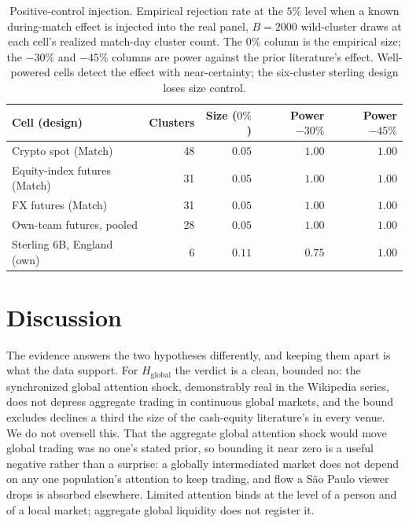 \documentclass[12pt]{article}
\begin{document}
\begin{table}[h]\centering\small\setlength{\tabcolsep}{7pt}
\caption{Positive-control injection. Empirical rejection rate at the $5\%$ level when a known during-match
effect is injected into the real panel, $B=2000$ wild-cluster draws at each cell's realized match-day cluster
count. The $0\%$ column is the empirical size; the $-30\%$ and $-45\%$ columns are power against the prior
literature's effect. Well-powered cells detect the effect with near-certainty; the six-cluster sterling design
loses size control.}\label{tab:inject}
\begin{tabular}{lrrrr}\toprule
Cell (design) & Clusters & Size ($0\%$) & Power $-30\%$ & Power $-45\%$ \\\midrule
Crypto spot (Match)            & 48 & $0.05$ & $1.00$ & $1.00$ \\
Equity-index futures (Match)   & 31 & $0.05$ & $1.00$ & $1.00$ \\
FX futures (Match)             & 31 & $0.05$ & $1.00$ & $1.00$ \\
Own-team futures, pooled       & 28 & $0.05$ & $1.00$ & $1.00$ \\
Sterling 6B, England (own)     & 6  & $0.11$ & $0.75$ & $1.00$ \\\bottomrule
\end{tabular}
\end{table}

\section{Discussion}\label{sec:disc}
The evidence answers the two hypotheses differently, and keeping them apart is what the data support. For $H_{\text{global}}$ the verdict is a clean, bounded no: the synchronized global attention shock, demonstrably real in the Wikipedia series, does not depress aggregate trading in continuous global markets, and the bound excludes declines a third the size of the cash-equity literature's in every venue. We do not oversell this. That the aggregate global attention shock would move global trading was no one's stated prior, so bounding it near zero is a useful negative rather than a surprise: a globally intermediated market does not depend on any one population's attention to keep trading, and flow a S\~ao Paulo viewer drops is absorbed elsewhere. Limited attention binds at the level of a person and of a local market; aggregate global liquidity does not register it.
\end{document}
